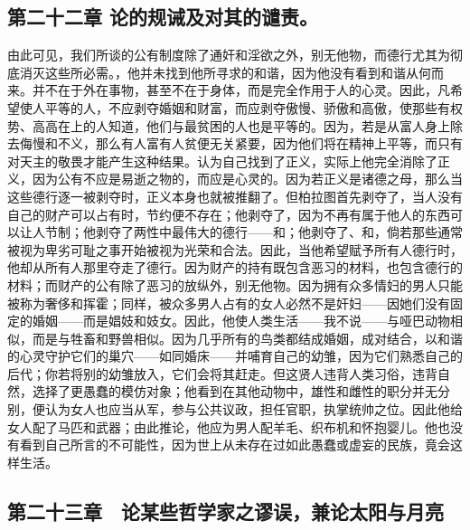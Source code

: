 \subsection{第二十二章 论的规诫及对其的谴责。}

由此可见，我们所谈的公有制度除了通奸和淫欲之外，别无他物，而德行尤其为彻底消灭这些所必需。，他并未找到他所寻求的和谐，因为他没有看到和谐从何而来。并不在于外在事物，甚至不在于身体，而是完全作用于人的心灵。因此，凡希望使人平等的人，不应剥夺婚姻和财富，而应剥夺傲慢、骄傲和高傲，使那些有权势、高高在上的人知道，他们与最贫困的人也是平等的。因为，若是从富人身上除去侮慢和不义，那么有人富有人贫便无关紧要，因为他们将在精神上平等，而只有对天主的敬畏才能产生这种结果。认为自己找到了正义，实际上他完全消除了正义，因为公有不应是易逝之物的，而应是心灵的。因为若正义是诸德之母，那么当这些德行逐一被剥夺时，正义本身也就被推翻了。但柏拉图首先剥夺了，当人没有自己的财产可以占有时，节约便不存在；他剥夺了，因为不再有属于他人的东西可以让人节制；他剥夺了两性中最伟大的德行——和；他剥夺了、和，倘若那些通常被视为卑劣可耻之事开始被视为光荣和合法。因此，当他希望赋予所有人德行时，他却从所有人那里夺走了德行。因为财产的持有既包含恶习的材料，也包含德行的材料；而财产的公有除了恶习的放纵外，别无他物。因为拥有众多情妇的男人只能被称为奢侈和挥霍；同样，被众多男人占有的女人必然不是奸妇——因她们没有固定的婚姻——而是娼妓和妓女。因此，他使人类生活——我不说——与哑巴动物相似，而是与牲畜和野兽相似。因为几乎所有的鸟类都结成婚姻，成对结合，以和谐的心灵守护它们的巢穴——如同婚床——并哺育自己的幼雏，因为它们熟悉自己的后代；你若将别的幼雏放入，它们会将其赶走。但这贤人违背人类习俗，违背自然，选择了更愚蠢的模仿对象；他看到在其他动物中，雄性和雌性的职分并无分别，便认为女人也应当从军，参与公共议政，担任官职，执掌统帅之位。因此他给女人配了马匹和武器；由此推论，他应为男人配羊毛、织布机和怀抱婴儿。他也没有看到自己所言的不可能性，因为世上从未存在过如此愚蠢或虚妄的民族，竟会这样生活。\par


\subsection{第二十三章　论某些哲学家之谬误，兼论太阳与月亮}

